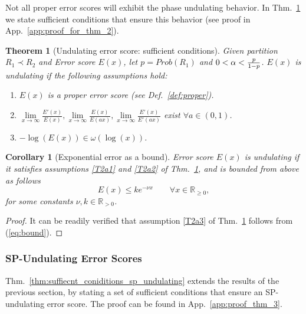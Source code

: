 \documentclass{article}
\newcommand{\R}{\mathbb{R}}
\newcommand{\pR}{1}\newcommand{\rR}{2}\newcommand{\prR}{i}
\newcommand{\ahard}{a}
\newcommand{\psn}{\R_{\ge 0}}
\newcommand{\prn}{\R_{> 0}}
\newcommand{\app}{App.}
\newtheorem{theorem}{Theorem}
\newtheorem{corollary}{Corollary}
\begin{document}
Not all proper error scores will exhibit the phase undulating behavior. In Thm.~\ref{thm:suffiecnt_coniditions_undulating} we state sufficient conditions that ensure this behavior (see proof in \app~\ref{app:proof_for_thm_2}).
\begin{theorem}[Undulating error score: sufficient conditions]
\label{thm:suffiecnt_coniditions_undulating}
Given partition $R_\pR\prec R_\rR$ and Error score $E(x)$, let $p=Prob(R_\pR)$ and $0<\alpha<\frac{p}{1-p}$. $E(x)$ is undulating if the following assumptions hold:
\begin{enumerate}[label=(\roman*)]
\item $E(x)$ is a proper \emph{error score} (see Def.~\ref{def:proper}).
\label{T2a1}
\item \label{T2a2}
$\lim\limits_{x\to\infty}\frac{E'(x)}{E(x)},\lim\limits_{x\rightarrow\infty}\frac{E(x)}{E(\ahard x)},\lim\limits_{x\rightarrow\infty}\frac{E'(x)}{E'(\ahard x)}$ exist $\forall\ahard\!\in\! (0,1)$.
\item 
\label{T2a3}
$-\log(E(x))\in\omega\left(\log(x)\right)$. 
\end{enumerate}
\end{theorem}








\begin{corollary}[Exponential error as a bound]
\label{cor:exp_undulating}
\emph{Error score} $E(x)$ is undulating if it satisfies assumptions \ref{T2a1} and \ref{T2a2} of Thm.~\ref{thm:suffiecnt_coniditions_undulating}, and is bounded from above as follows
\begin{equation}
\label{eq:bound}
E(x) \leq k e^{-\nu x} \qquad\forall x\in\psn,
\end{equation}
for some constants $\nu,k\in\prn$.
\end{corollary}
\begin{proof}
It can be readily verified that assumption \ref{T2a3} of Thm.~\ref{thm:suffiecnt_coniditions_undulating} follows from (\ref{eq:bound}).
\end{proof}


\subsubsection{SP-Undulating Error Scores}
\label{sec:SP_undulating}
Thm.~\ref{thm:suffiecnt_coniditions_sp_undulating} extends the results of the previous section, by stating a set of sufficient conditions that ensure an SP-undulating error score.
The proof can be found in \app~\ref{app:proof_thm_3}.
\end{document}
